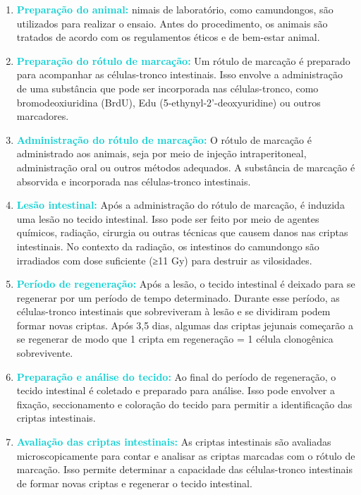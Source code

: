 \documentclass[11pt,a4paper]{article}
\begin{document}
	\begin{enumerate}[label=\textcolor{CarnationPink}{\arabic*${}^\circ $}]
		\item \textcolor{DarkTurquoise}{\textbf{Preparação do animal:}} nimais de laboratório, como camundongos, são utilizados para realizar o ensaio. Antes do procedimento, os animais são tratados de acordo com os regulamentos éticos e de bem-estar animal.
		\item \textcolor{DarkTurquoise}{\textbf{Preparação do rótulo de marcação:}} Um rótulo de marcação é preparado para acompanhar as células-tronco intestinais. Isso envolve a administração de uma substância que pode ser incorporada nas células-tronco, como bromodeoxiuridina (BrdU), Edu (5-ethynyl-2'-deoxyuridine) ou outros marcadores.
		\item \textcolor{DarkTurquoise}{\textbf{Administração do rótulo de marcação:}} O rótulo de marcação é administrado aos animais, seja por meio de injeção intraperitoneal, administração oral ou outros métodos adequados. A substância de marcação é absorvida e incorporada nas células-tronco intestinais.
		\item \textcolor{DarkTurquoise}{\textbf{Lesão intestinal:}} Após a administração do rótulo de marcação, é induzida uma lesão no tecido intestinal. Isso pode ser feito por meio de agentes químicos, radiação, cirurgia ou outras técnicas que causem danos nas criptas intestinais. No contexto da radiação, os intestinos do camundongo são irradiados com dose suficiente (≥11 Gy) para destruir as vilosidades.
		\item \textcolor{DarkTurquoise}{\textbf{Período de regeneração:}} Após a lesão, o tecido intestinal é deixado para se regenerar por um período de tempo determinado. Durante esse período, as células-tronco intestinais que sobreviveram à lesão e se dividiram podem formar novas criptas. Após 3,5 dias, algumas das criptas jejunais começarão a se regenerar de modo que 1 cripta em regeneração = 1 célula clonogênica sobrevivente.
		\item \textcolor{DarkTurquoise}{\textbf{Preparação e análise do tecido:}} Ao final do período de regeneração, o tecido intestinal é coletado e preparado para análise. Isso pode envolver a fixação, seccionamento e coloração do tecido para permitir a identificação das criptas intestinais.
		\item \textcolor{DarkTurquoise}{\textbf{Avaliação das criptas intestinais:}} As criptas intestinais são avaliadas microscopicamente para contar e analisar as criptas marcadas com o rótulo de marcação. Isso permite determinar a capacidade das células-tronco intestinais de formar novas criptas e regenerar o tecido intestinal.
	\end{enumerate}
\end{document}
